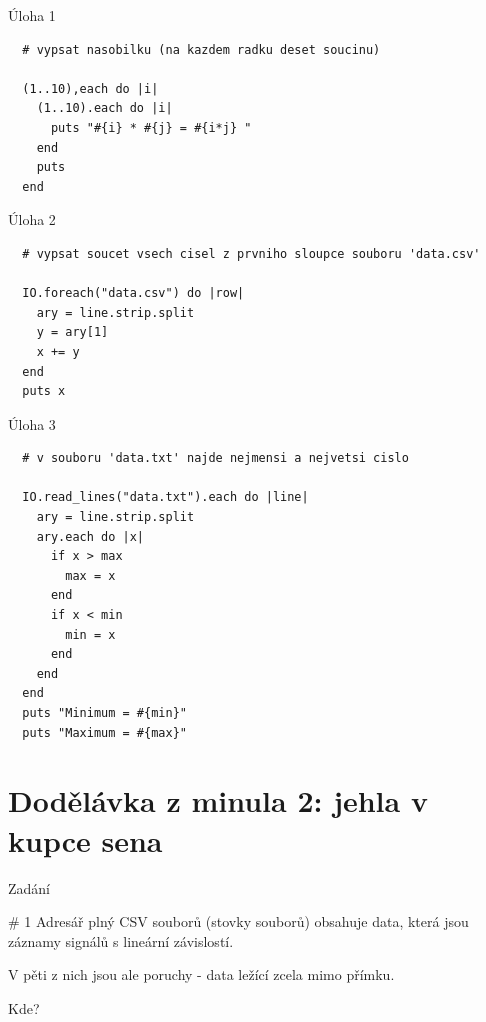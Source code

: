 \documentclass{beamer}
\begin{document}
\begin{frame}[fragile]{Úloha 1}
    \scriptsize
\begin{verbatim}
  # vypsat nasobilku (na kazdem radku deset soucinu)

  (1..10),each do |i|
    (1..10).each do |i|
      puts "#{i} * #{j} = #{i*j} "
    end
    puts
  end
\end{verbatim}
\end{frame}

\begin{frame}[fragile]{Úloha 2}
    \scriptsize
\begin{verbatim}
  # vypsat soucet vsech cisel z prvniho sloupce souboru 'data.csv'

  IO.foreach("data.csv") do |row|
    ary = line.strip.split
    y = ary[1]
    x += y
  end
  puts x
\end{verbatim}
\end{frame}

\begin{frame}[fragile]{Úloha 3}
    \scriptsize
\begin{verbatim}
  # v souboru 'data.txt' najde nejmensi a nejvetsi cislo

  IO.read_lines("data.txt").each do |line|
    ary = line.strip.split
    ary.each do |x|
      if x > max
        max = x
      end
      if x < min
        min = x
      end
    end
  end
  puts "Minimum = #{min}"
  puts "Maximum = #{max}"
\end{verbatim}
\end{frame}

\section{Dodělávka z minula 2: jehla v kupce sena}

\begin{frame}{Zadání}
  \begin{block}{\# 1}
    Adresář plný CSV souborů (stovky souborů) obsahuje data, která jsou záznamy signálů s lineární závislostí.
    
    V pěti z nich jsou ale poruchy - data ležící zcela mimo přímku.
    
    Kde?
  \end{block}
\end{frame}
\end{document}
